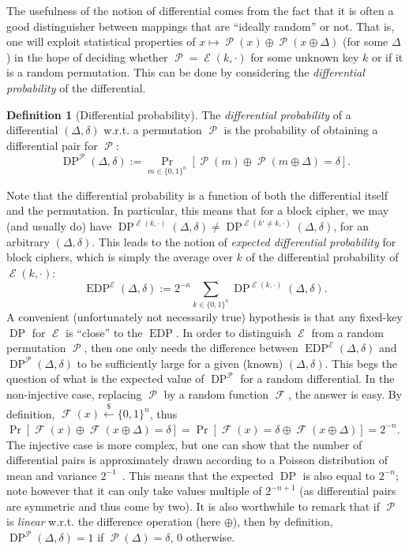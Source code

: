 \documentclass[11pt,a4paper]{article}
\theoremstyle{definition}
\newtheorem{defi}{Definition}
\theoremstyle{theorem}
\DeclareMathOperator\E{\mathcal{E}}
\DeclareMathOperator\F{\mathcal{F}}
\DeclareMathOperator\Perm{\mathcal{P}}
\DeclareMathOperator\DP{\mathrm{DP}}
\DeclareMathOperator\EDP{\mathrm{EDP}}
\newcommand\msb{\{0,1\}^n}
\newcommand\ksb{\{0,1\}^\kappa}
\newcommand\randraw{\xleftarrow{{\scriptscriptstyle\$}}}
\begin{document}
The usefulness of the notion of differential comes from the fact that it is often a good distinguisher between mappings that are ``ideally random'' or not.
That is, one will exploit statistical properties of $x \mapsto \Perm(x) \oplus \Perm(x \oplus \Delta)$ (for some $\Delta$) in the hope of deciding
whether $\Perm = \E(k,\cdot)$ for some unknown key $k$ or if it is a random permutation. This can be done by considering the \emph{differential
probability} of the differential.
\begin{defi}[Differential probability]
The \emph{differential probability} of a differential $(\Delta,\delta)$ w.r.t. a permutation $\Perm$ is the probability of obtaining a differential
pair for $\Perm$:
\[
\DP^{\Perm}(\Delta,\delta) := \Pr_{m \in \msb}[\Perm(m) \oplus \Perm(m \oplus \Delta) = \delta].
\]
\end{defi}
Note that the differential probability is a function of both the differential itself and the permutation. In particular, this means that for
a block cipher, we may (and usually do) have $\DP^{\E(k,\cdot)}(\Delta,\delta) \neq \DP^{\E(k'\neq k,\cdot)}(\Delta,\delta)$, for an
arbitrary $(\Delta,\delta)$. This leads to the notion of \emph{expected differential probability} for block ciphers, which is simply
the average over $k$ of the differential probability of $\E(k,\cdot)$:
\[
\EDP^{\E}(\Delta,\delta) := 2^{-\kappa} \sum_{k \in \ksb} \DP^{\E(k,\cdot)}(\Delta,\delta).
\]
A convenient (unfortunately not necessarily true) hypothesis is that any fixed-key $\DP$ for $\E$ is ``close'' to the $\EDP$.
In order to distinguish $\E$ from a random permutation $\Perm$, then one only needs the difference between $\EDP^{\E}(\Delta,\delta)$ and
$\DP^{\Perm}(\Delta,\delta)$ to be sufficiently large for a given (known) $(\Delta,\delta)$.
This begs the question of what is the expected value of $\DP^{\Perm}$ for a random differential. In the non-injective case, replacing
$\Perm$ by a random function $\F$, the answer is easy. By definition, $\F(x) \randraw \msb$, thus $\Pr[\F(x) \oplus \F(x\oplus\Delta) = \delta]
= \Pr[\F(x) = \delta \oplus \F(x\oplus\Delta)] = 2^{-n}$. The injective case is more complex, but one can show that the number of
differential pairs is approximately drawn according to a Poisson distribution of mean and
variance $2^{-1}$~\cite{DBLP:journals/joc/OConnor95,DBLP:journals/jmc/DaemenR07}. This means
that the expected $\DP$ is also equal to $2^{-n}$; note however that it can only take values multiple of $2^{-n+1}$ (as differential
pairs are symmetric and thus come by two). It is also worthwhile to remark that if $\Perm$ is \emph{linear} w.r.t. the difference
operation (here $\oplus$), then by definition, $\DP^{\Perm}(\Delta,\delta) = 1$ if $\Perm(\Delta) = \delta$, $0$ otherwise.
\end{document}
